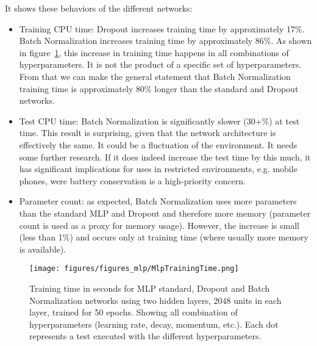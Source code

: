 \documentclass[../CAP6619_term_project_cgarbin.tex]{subfiles}
\begin{document}
It shows these behaviors of the different networks:

\begin{itemize}
\item Training CPU time: Dropout increases training time by approximately 17\%. Batch Normalization increases training time by approximately 86\%. As shown in figure~\ref{fig:MlpTrainingTime}, this increase in training time happens in all combinations of hyperparameters. It is not the product of a specific set of hyperparameters. From that we can make the general statement that Batch Normalization training time is approximately 80\% longer than the standard and Dropout networks.
\item Test CPU time: Batch Normalization is significantly slower (30+\%) at test time. This result is surprising, given that the network architecture is effectively the same. It could be a fluctuation of the environment. It needs some further research. If it does indeed increase the test time by this much, it has significant implications for uses in restricted environments, e.g. mobile phones, were battery conservation is a high-priority concern.
\item Parameter count: as expected, Batch Normalization uses more parameters than the standard MLP and Dropout and therefore more memory (parameter count is used as a proxy for memory usage). However, the increase is small (less than 1\%) and occurs only at training time (where usually more memory is available).
\end{itemize}

\begin{figure}[htbp]
\centerline{\texttt{[image: figures/figures\_mlp/MlpTrainingTime.png]}}
\caption{Training time in seconds for MLP standard, Dropout and Batch Normalization networks using two hidden layers, 2048 units in each layer, trained for 50 epochs. Showing all combination of hyperparameters (learning rate, decay, momentum, etc.). Each dot represents a test executed with the different hyperparameters.}
\label{fig:MlpTrainingTime}
\end{figure}
\end{document}
